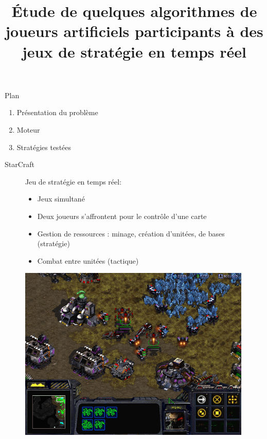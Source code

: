 \documentclass[french]{beamer}
\title{Étude de quelques algorithmes de joueurs artificiels participants à des jeux de stratégie en temps réel}
\begin{document}
\begin{frame}[plain]
    \maketitle
\end{frame}
\begin{frame}{Plan}
	\begin{enumerate}
		\item Présentation du problème
		\item Moteur
		\item Stratégies testées
	\end{enumerate}
\end{frame}
\begin{frame}{StarCraft}
	\begin{figure}
		\centering
		\begin{minipage}{0.5\textwidth}
			Jeu de stratégie en temps réel:
			\begin{itemize}
				\item Jeux simultané
				\item Deux joueurs s'affrontent pour le contrôle d'une carte
				\item Gestion de ressources : minage, création d'unitées, de bases (stratégie)
				\item Combat entre unitées (tactique)
			\end{itemize}
		\end{minipage}\hfill
		\begin{minipage}{0.5\textwidth}
			\centering
			\includegraphics[width=0.99\textwidth]{screen_starcraft.png}
		\end{minipage}
	\end{figure}
\end{frame}
\end{document}
